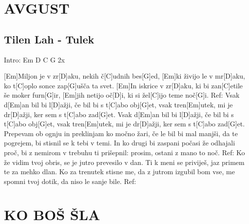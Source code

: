 \documentclass{article}
\begin{document}
	
\tableofcontents
\pagebreak
\section*{AVGUST}
%
\subsection*{Tilen Lah - Tulek}

\begin{guitar}
Intro: Em D C G 2x 

[Em]Miljon je v zr[D]aku, nekih č[C]udnih bes[G]ed,
[Em]ki živijo le v mr[D]aku, ko t[C]oplo sonce zap[G]ušča ta svet.
[Em]In iskrice v zr[D]aku, ki bi zan[C]etile še moker furn[G]ir,
[Em]jih netijo oč[D]i, ki si žel[C]ijo teme noč[G]i.
\linebreak
Ref:
Vsak d[Em]an bil bi l[D]ažji, če bil bi s t[C]abo obj[G]et, 
vsak tren[Em]utek, mi je dr[D]ažji, ker sem s t[C]abo zad[G]et.
Vsak d[Em]an bil bi l[D]ažji, če bil bi s t[C]abo obj[G]et, 
vsak tren[Em]utek, mi je dr[D]ažji, ker sem s t[C]abo zad[G]et.
\linebreak
Prepevam ob ognju in preklinjam ko močno žari, 
če le bil bi mal manjši, da te pogrejem, bi stisnil se k tebi v temi.
In ko drugi bi zaspani počasi že odhajali proč, 
bi z nemirom v trebuhu ti prišepnil: prosim, ostani z mano to noč.
\linebreak
Ref:
\linebreak
Ko že vidim tvoj obris, se je jutro prevesilo v dan.
Ti k meni se priviješ, jaz primem te za mehko dlan.
Ko za trenutek stisne me, da z jutrom izgubil bom vse,
me spomni tvoj dotik, da niso le sanje bile.
\linebreak
Ref:
\end{guitar}

\pagebreak

\section*{KO BOŠ ŠLA}
%
\end{document}
